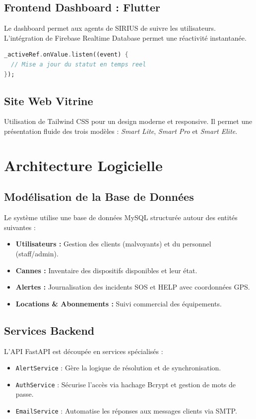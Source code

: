 \documentclass[12pt,a4paper]{report}
\begin{document}
\section{Frontend Dashboard : Flutter}
Le dashboard permet aux agents de SIRIUS de suivre les utilisateurs. L'intégration de Firebase Realtime Database permet une réactivité instantanée.
\begin{lstlisting}[language=Dart, caption=Synchronisation Firebase dans Flutter]
_activeRef.onValue.listen((event) {
  // Mise a jour du statut en temps reel
});
\end{lstlisting}

\section{Site Web Vitrine}
Utilisation de Tailwind CSS pour un design moderne et responsive. Il permet une présentation fluide des trois modèles : \textit{Smart Lite}, \textit{Smart Pro} et \textit{Smart Elite}.

\chapter{Architecture Logicielle}
\section{Modélisation de la Base de Données}
Le système utilise une base de données MySQL structurée autour des entités suivantes :
\begin{itemize}
    \item \textbf{Utilisateurs :} Gestion des clients (malvoyants) et du personnel (staff/admin).
    \item \textbf{Cannes :} Inventaire des dispositifs disponibles et leur état.
    \item \textbf{Alertes :} Journalisation des incidents SOS et HELP avec coordonnées GPS.
    \item \textbf{Locations \& Abonnements :} Suivi commercial des équipements.
\end{itemize}

\section{Services Backend}
L'API FastAPI est découpée en services spécialisés :
\begin{itemize}
    \item \texttt{AlertService} : Gère la logique de résolution et de synchronisation.
    \item \texttt{AuthService} : Sécurise l'accès via hachage Bcrypt et gestion de mots de passe.
    \item \texttt{EmailService} : Automatise les réponses aux messages clients via SMTP.
\end{itemize}
\end{document}
